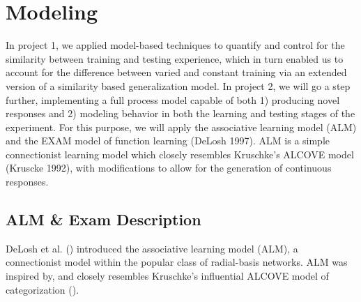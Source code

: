 \documentclass[
  letterpaper,
  DIV=11,
  numbers=noendperiod,
  oneside]{scrartcl}
\begin{document}
\section{Modeling}\label{modeling}

In project 1, we applied model-based techniques to quantify and control
for the similarity between training and testing experience, which in
turn enabled us to account for the difference between varied and
constant training via an extended version of a similarity based
generalization model. In project 2, we will go a step further,
implementing a full process model capable of both 1) producing novel
responses and 2) modeling behavior in both the learning and testing
stages of the experiment. For this purpose, we will apply the
associative learning model (ALM) and the EXAM model of function learning
(DeLosh 1997). ALM is a simple connectionist learning model which
closely resembles Kruschke's ALCOVE model (Kruscke 1992), with
modifications to allow for the generation of continuous responses.

\subsection{ALM \& Exam Description}\label{alm-exam-description}

DeLosh et al. ()
introduced the associative learning model (ALM), a connectionist model
within the popular class of radial-basis networks. ALM was inspired by,
and closely resembles Kruschke's influential ALCOVE model of
categorization
().
\end{document}
